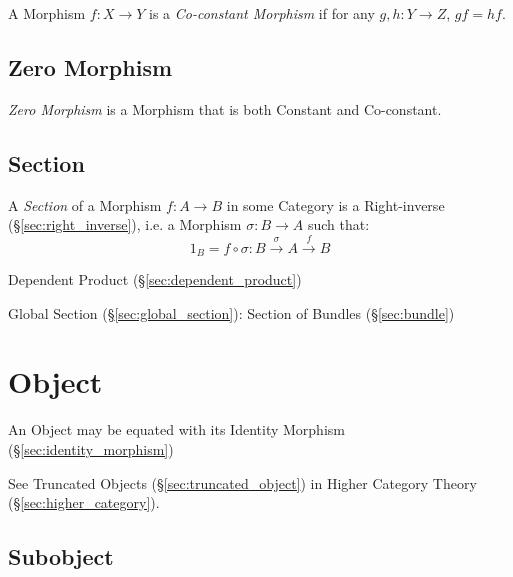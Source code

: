 A Morphism $f : X \rightarrow Y$ is a \emph{Co-constant Morphism} if
for any $g, h : Y \rightarrow Z$, $gf = hf$.



\subsection{Zero Morphism}\label{sec:zero_morphism}

\emph{Zero Morphism} is a Morphism that is both Constant and
Co-constant.



\subsection{Section}\label{sec:section}

A \emph{Section} of a Morphism $f : A \rightarrow B$ in some Category
is a Right-inverse (\S\ref{sec:right_inverse}), i.e. a Morphism
$\sigma : B \rightarrow A$ such that:
\[
  1_B = f \circ \sigma : B \xrightarrow{\sigma} A \xrightarrow{f} B
\]

Dependent Product (\S\ref{sec:dependent_product})

Global Section (\S\ref{sec:global_section}): Section of Bundles
(\S\ref{sec:bundle})



\section{Object}\label{sec:category_object}

An Object may be equated with its Identity Morphism
(\S\ref{sec:identity_morphism})

\fist See Truncated Objects (\S\ref{sec:truncated_object}) in Higher
Category Theory (\S\ref{sec:higher_category}).



\subsection{Subobject}\label{sec:subobject}

